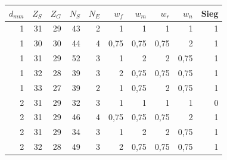 \documentclass[12pt,a4paper,bibliography=totocnumbered,listof=totocnumbered]{article}
\begin{document}
\begin{table}[h]
  \centering
    \begin{tabular}{|rrrrrrrrrr|}
    \hline
    $d_{mm}$ & $Z_{S}$ & $Z_{G}$ & $N_{S}$ & $N_E$ & $w_f$ & $w_m$ & $w_r$ & $w_n$ & Sieg\\ [0.5ex]
    \hline\hline
    1     & 31    & 29    & 43    & 2     & 1\cellcolor[rgb]{ .949,  .949,  .949}     & 1\cellcolor[rgb]{ .949,  .949,  .949}     & 1\cellcolor[rgb]{ .949,  .949,  .949}     & 1\cellcolor[rgb]{ .949,  .949,  .949}     & 1\cellcolor[rgb]{ .949,  .949,  .949} \\
    1     & 30    & 30    & 44    & 4     & 0,75\cellcolor[rgb]{ .949,  .949,  .949}  & 0,75\cellcolor[rgb]{ .949,  .949,  .949}  & 0,75\cellcolor[rgb]{ .949,  .949,  .949}  & 2\cellcolor[rgb]{ .949,  .949,  .949}     & 1\cellcolor[rgb]{ .949,  .949,  .949} \\
    1     & 31    & 29    & 52    & 3     & 1\cellcolor[rgb]{ .949,  .949,  .949}     & 2\cellcolor[rgb]{ .949,  .949,  .949}     & 2\cellcolor[rgb]{ .949,  .949,  .949}     & 0,75\cellcolor[rgb]{ .949,  .949,  .949}  & 1\cellcolor[rgb]{ .949,  .949,  .949} \\
    1     & 32    & 28    & 39    & 3     & 2\cellcolor[rgb]{ .949,  .949,  .949}     & 0,75\cellcolor[rgb]{ .949,  .949,  .949}  & 0,75\cellcolor[rgb]{ .949,  .949,  .949}  & 0,75\cellcolor[rgb]{ .949,  .949,  .949}  & 1\cellcolor[rgb]{ .949,  .949,  .949} \\
    1     & 33    & 27    & 39    & 2     & 1\cellcolor[rgb]{ .949,  .949,  .949}     & 0,75\cellcolor[rgb]{ .949,  .949,  .949}  & 2\cellcolor[rgb]{ .949,  .949,  .949}     & 0,75\cellcolor[rgb]{ .949,  .949,  .949}  & 1\cellcolor[rgb]{ .949,  .949,  .949} \\
    \hline
    2     & 31    & 29    & 32    & 3     & 1     & 1     & 1     & 1     & 0 \\
    2     & 31    & 29    & 46    & 4     & 0,75\cellcolor[rgb]{ .949,  .949,  .949}  & 0,75\cellcolor[rgb]{ .949,  .949,  .949}  & 0,75\cellcolor[rgb]{ .949,  .949,  .949}  & 2\cellcolor[rgb]{ .949,  .949,  .949}     & 1\cellcolor[rgb]{ .949,  .949,  .949} \\
    2     & 31    & 29    & 34    & 3     & 1\cellcolor[rgb]{ .949,  .949,  .949}     & 2\cellcolor[rgb]{ .949,  .949,  .949}     & 2\cellcolor[rgb]{ .949,  .949,  .949}     & 0,75\cellcolor[rgb]{ .949,  .949,  .949}  & 1\cellcolor[rgb]{ .949,  .949,  .949} \\
    2     & 32    & 28    & 49    & 3     & 2\cellcolor[rgb]{ .949,  .949,  .949}     & 0,75\cellcolor[rgb]{ .949,  .949,  .949}  & 0,75\cellcolor[rgb]{ .949,  .949,  .949}  & 0,75\cellcolor[rgb]{ .949,  .949,  .949}  & 1\cellcolor[rgb]{ .949,  .949,  .949} \\

\end{tabular}
\end{table}
\end{document}
